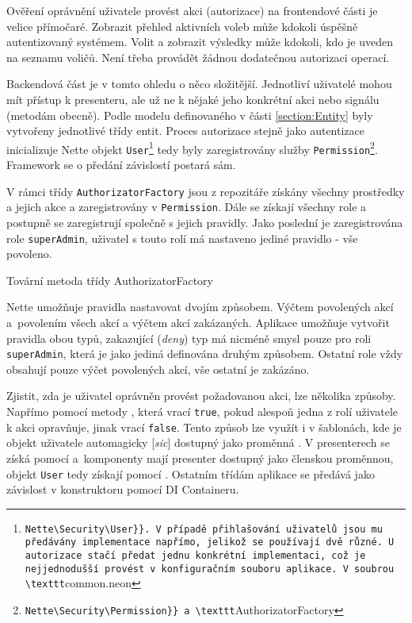 Ověření oprávnění uživatele provést akci (autorizace) na frontendové části je velice přímočaré. Zobrazit přehled aktivních voleb může kdokoli úspěšně autentizovaný systémem. Volit a zobrazit výsledky může kdokoli, kdo je uveden na seznamu voličů. Není třeba provádět žádnou dodatečnou autorizaci operací.

Backendová část je v tomto ohledu o něco složitější. Jednotliví uživatelé mohou mít přístup k presenteru, ale už ne k nějaké jeho konkrétní akci nebo signálu (metodám obecně). Podle modelu definovaného v části \ref{section:Entity} byly vytvořeny jednotlivé třídy entit. Proces autorizace stejně jako autentizace inicializuje Nette objekt \texttt{User}\footnote{\label{user}\Verb{Nette\Security\User}}. V případě přihlašování uživatelů jsou mu předávány implementace napřímo, jelikož se používají dvě různé. U autorizace stačí předat jednu konkrétní implementaci, což je nejjednodušší provést v konfiguračním souboru aplikace. V soubrou \texttt{common.neon} tedy byly zaregistrovány služby \texttt{Permission}\footnote{\Verb{Nette\Security\Permission}} a \texttt{AuthorizatorFactory}. Framework se o předání závislostí postará sám.

V rámci třídy \texttt{AuthorizatorFactory} jsou z repozitáře získány všechny prostředky a jejich akce a zaregistrovány v \texttt{Permission}. Dále se získají všechny role a postupně se zaregistrují společně s jejich pravidly. Jako poslední je zaregistrována role \texttt{superAdmin}, uživatel s touto rolí má nastaveno jediné pravidlo - vše povoleno. 

\begin{listing}[ht]
\caption{Tovární metoda třídy AuthorizatorFactory}
\label{php:autorizace}
\end{listing}

Nette umožňuje pravidla nastavovat dvojím způsobem. Výčtem povolených akcí a~povolením všech akcí a výčtem akcí zakázaných. Aplikace umožňuje vytvořit pravidla obou typů, zakazující (\textit{deny}) typ má nicméně smysl pouze pro roli \texttt{superAdmin}, která je jako jediná definována druhým způsobem. Ostatní role vždy obsahují pouze výčet povolených akcí, vše ostatní je zakázáno.

Zjistit, zda je uživatel oprávněn provést požadovanou akci, lze několika způsoby. Napřímo pomocí metody , která vrací \texttt{true}, pokud alespoň jedna z rolí uživatele k akci opravňuje, jinak vrací \texttt{false}. Tento způsob lze využít i v šablonách, kde je objekt uživatele automagicky [\textit{sic}] dostupný jako proměnná %
. V presenterech se získá pomocí  %
 a~komponenty mají presenter dostupný jako členskou proměnnou, objekt \texttt{User} tedy získají pomocí %
. Ostatním třídám aplikace se předává jako závislost v konstruktoru pomocí DI Containeru.

